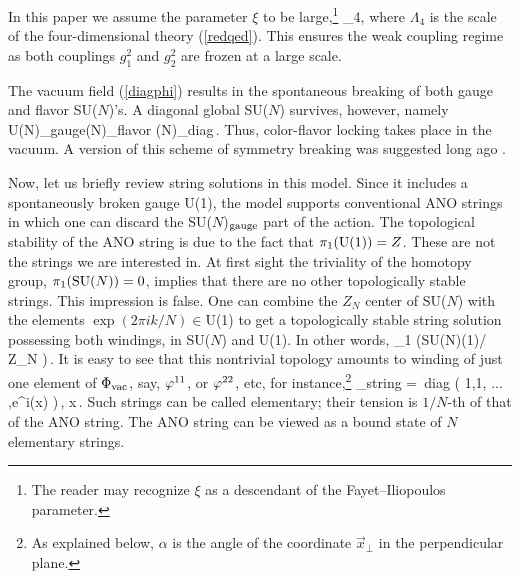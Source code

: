 In this paper we assume the parameter $\xi$ to be large,\footnote{The reader may
recognize $\xi$ as a descendant of the Fayet--Iliopoulos parameter.}
\beq
\sqrt{\xi}\gg \Lambda_4,
\label{weakcoupling} 
\eeq
where $\Lambda_4$ is the scale of the four-dimensional theory (\ref{redqed}).
This ensures the weak coupling regime as both couplings $g^2_1$ and $g^2_2$
are frozen at a large scale.

The  vacuum field (\ref{diagphi}) results in  the spontaneous
breaking of both gauge and flavor SU($N$)'s.
A diagonal global SU($N$) survives, however,
namely
\beq
{\rm U}(N)_{\rm gauge}(N)_{\rm flavor}
(N)_{\rm diag}\,.
\eeq
Thus, color-flavor locking takes place in the vacuum.
A version of this  scheme of symmetry breaking was suggested
long ago \cite{BarH}.

Now, let us briefly review string solutions in this model.
Since it includes a spontaneously broken gauge U(1),
the model supports
conventional ANO strings \cite{ANO}
in which one can discard the SU($N$)$_{\rm gauge}$ part 
of the action.
The topological stability of the ANO string is due to the fact that
$\pi_1({\rm U(1)}) = Z$. These are not the strings we are interested in.
At first sight the triviality of the homotopy group, $\pi_1 ({\rm SU}(N)) =0$, 
implies that there are no other topologically stable strings.
This impression is false. One can
combine the $Z_N$ center of SU($N$) with the elements $\exp (2\pi i k/N)\in$U(1) 
to get a topologically stable string solution
possessing both windings, in SU($N$) and U(1). In other words,
\beq
\pi_1 \left({\rm SU}(N)(1)/ Z_N
\right)\,.
\eeq
It is easy to see that this nontrivial topology amounts to winding
of just one element of $\Phi_{\rm vac}$, say, $\varphi^{11}$, or
$\varphi^{22}$, etc, for instance,\footnote{As explained below,
$\alpha$ is the angle of
the coordinate  $\vec{x}_\perp$ in the perpendicular plane.}
\beq
\Phi_{\rm string} = \sqrt{\xi}\,{\rm diag} ( 1,1, ... ,e^{i\alpha (x) })\,,
\quad x\to\infty \,.
\label{ansa}
\eeq
Such strings can be called elementary;
their tension is $1/N$-th of that of the ANO string.
The ANO string can be viewed as a bound state of 
$N$ elementary strings.

